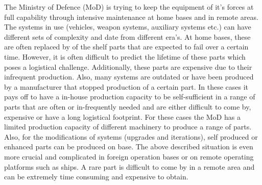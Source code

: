 The Ministry of Defence (MoD) is trying to keep the equipment of it's forces at full capability through intensive maintenance at home bases and in remote areas. The systems in use (vehicles, weapon systems, auxiliary systems etc.) can have different sets of complexity and date from different era's. At home bases, these are often replaced by of the shelf parts that are expected to fail over a certain time. However, it is often difficult to predict the lifetime of these parts which poses a logistical challenge. Additionally, these parts are expensive due to their infrequent production. Also, many systems are outdated or have been produced by a manufacturer that stopped production of a certain part. In these cases it pays off to have a in-house production capacity to be self-sufficient in a range of parts that are often or in-frequently needed and are either difficult to come by, expensive or have a long logistical footprint. For these cases the MoD has a limited production capacity of different machinery to produce a range of parts. Also, for the modifications of systems (upgrades and iterations), self produced or enhanced parts can be produced on base. The above described situation is even more crucial and complicated in foreign operation bases or on remote operating platforms such as ships. A rare part is difficult to come by in a remote area and can be extremely time consuming and expensive to obtain. 

